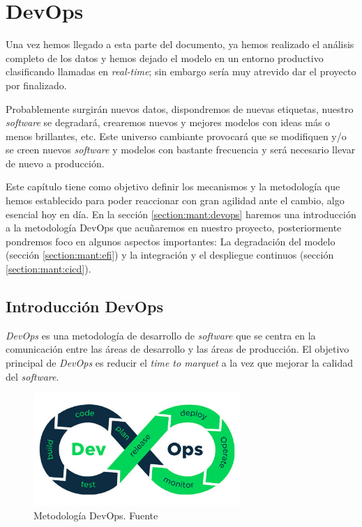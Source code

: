 \chapter{DevOps}
\label{chapter:mant}

Una vez hemos llegado a esta parte del documento, ya hemos realizado el análisis completo de los datos y hemos dejado el modelo en un entorno productivo clasificando llamadas en \textit{real-time}; sin embargo sería muy atrevido dar el proyecto por finalizado.

Probablemente surgirán nuevos datos, dispondremos de nuevas etiquetas, nuestro \textit{software} se degradará, crearemos nuevos y mejores modelos con ideas más o menos brillantes, etc. Este universo cambiante provocará que se modifiquen y/o se creen nuevos \textit{software} y modelos con bastante frecuencia y será necesario llevar de nuevo a producción.  

Este capítulo tiene como objetivo definir los mecanismos y la metodología que hemos establecido para poder reaccionar con gran agilidad ante el cambio, algo esencial hoy en día. En la sección \ref{section:mant:devops} haremos una introducción a la metodología DevOps que acuñaremos en nuestro proyecto, posteriormente pondremos foco en algunos aspectos importantes: La degradación del modelo (sección \ref{section:mant:efi}) y la integración y el despliegue continuos (sección \ref{section:mant:cicd}).


\section{Introducción DevOps}

\textit{DevOps} es una metodología de desarrollo de \textit{software} que se centra en la comunicación entre las áreas de desarrollo y las áreas de producción. El objetivo principal de \textit{DevOps} es reducir el \textit{time to marquet} a la vez que mejorar la calidad del \textit{software}.

\label{section:mant:devops}


\begin{figure}[!ht]
	\centering
	\includegraphics[width=0.7\textwidth]{images/mant/devops}
	\caption{Metodología DevOps. Fuente \cite{devops}}
	\label{fig:devops}
\end{figure}




